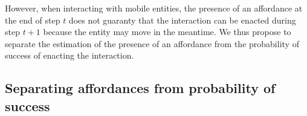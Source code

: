 \documentclass[conference]{IEEEtran}
\begin{document}


However, when interacting with mobile entities, the presence of an affordance at the end of step $t$ does not guaranty that the interaction can be enacted during step $t+1$ because the entity may move in the meantime.
We thus propose to separate the estimation of the presence of an affordance from the probability of success of enacting the interaction.




\subsection{Separating affordances from probability of success}\label{separate}
\end{document}
